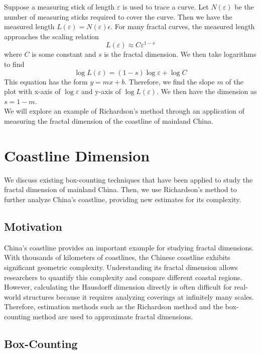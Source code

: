 \documentclass{article}
\begin{document}
Suppose a measuring stick of length $\varepsilon$ is used to trace a curve. Let $N(\varepsilon)$ be the number of measuring sticks required to cover the curve. Then we have the measured length $L(\varepsilon) = N(\varepsilon)\epsilon$. For many fractal curves, the measured length approaches the scaling relation $$L(\varepsilon) \approx C \varepsilon^{1-s}$$
where $C$ is some constant and $s$ is the fractal dimension. We then take logarithms to find $$\log L(\varepsilon) = (1-s) \log \varepsilon + \log C$$
This equation has the form $y = mx+b$. Therefore, we find the slope $m$ of the plot with x-axis of $\log \varepsilon$ and y-axis of $\log L(\varepsilon)$. We then have the dimension as $s = 1-m$. \\

We will explore an example of Richardson's method through an application of measuring the fractal dimension of the coastline of mainland China.


\section{Coastline Dimension}

We discuss existing box-counting techniques that have been applied to study the fractal dimension of mainland China. Then, we use Richardson's method to further analyze China's coastline, providing new estimates for its complexity. \\

\subsection{Motivation}

China's coastline provides an important example for studying fractal dimensions. With thousands of kilometers of coastlines, the Chinese coastline exhibits significant geometric complexity. Understanding its fractal dimension allows researchers to quantify this complexity and compare different coastal regions. However, calculating the Hausdorff dimension directly is often difficult for real-world structures because it requires analyzing coverings at infinitely many scales. Therefore, estimation methods such as the Richardson method and the box-counting method are used to approximate fractal dimensions.

\subsection{Box-Counting}
\end{document}
